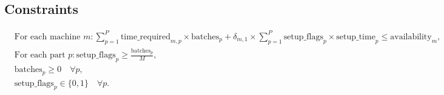 \documentclass{article}
\begin{document}
\subsection*{Constraints}
\begin{align*}
    &\text{For each machine } m: \sum_{p=1}^{P} \text{time\_required}_{m,p} \times \text{batches}_{p} + \delta_{m,1} \times \sum_{p=1}^{P} \text{setup\_flags}_{p} \times \text{setup\_time}_{p} \leq \text{availability}_{m}, \\
    &\text{For each part } p: \text{setup\_flags}_{p} \geq \frac{\text{batches}_{p}}{M}, \\
    &\text{batches}_{p} \geq 0 \quad \forall p, \\
    &\text{setup\_flags}_{p} \in \{0, 1\} \quad \forall p.
\end{align*}
\end{document}

